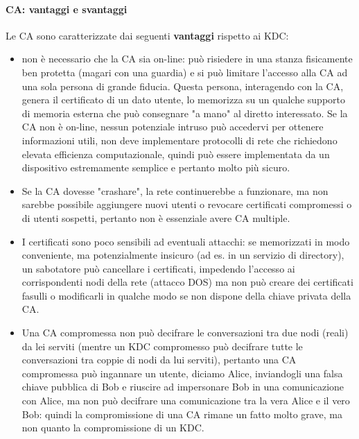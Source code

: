 \paragraph{CA: vantaggi e svantaggi}
Le CA sono caratterizzate dai seguenti \textbf{vantaggi} rispetto ai KDC:
\begin{itemize}
	\item non è necessario che la CA sia on-line: può risiedere in una stanza fisicamente ben protetta (magari con una guardia) e si può limitare l'accesso alla CA ad una sola persona di grande fiducia. Questa persona, interagendo con la CA, genera il certificato di un dato utente, lo memorizza su un qualche supporto di memoria esterna che può consegnare "a mano" al diretto interessato. Se la CA non è on-line, nessun potenziale intruso può accedervi per ottenere informazioni utili, non deve implementare protocolli di rete che richiedono elevata efficienza computazionale, quindi può essere implementata da un dispositivo estremamente semplice e pertanto molto più sicuro.
	
	\item Se la CA dovesse "crashare", la rete continuerebbe a funzionare, ma non sarebbe possibile aggiungere nuovi utenti o revocare certificati compromessi o di utenti sospetti, pertanto non è essenziale avere CA multiple. 
	
	\item I certificati sono poco sensibili ad eventuali attacchi: se memorizzati in modo conveniente, ma potenzialmente insicuro (ad es. in un servizio di directory), un sabotatore può cancellare i certificati, impedendo l'accesso ai corrispondenti nodi della rete (attacco DOS) ma non può creare dei certificati fasulli o modificarli in qualche modo se non dispone della chiave privata della CA.
	
	\item Una CA compromessa non può decifrare le conversazioni tra due nodi (reali) da lei serviti (mentre un KDC compromesso può decifrare tutte le conversazioni tra coppie di nodi da lui serviti), pertanto una CA compromessa può ingannare un utente, diciamo Alice, inviandogli una falsa chiave pubblica di Bob e riuscire ad impersonare Bob in una comunicazione con Alice, ma non può decifrare una comunicazione tra la vera Alice e il vero Bob: quindi la compromissione di una CA rimane un fatto molto grave, ma non quanto la compromissione di un KDC.
\end{itemize}

